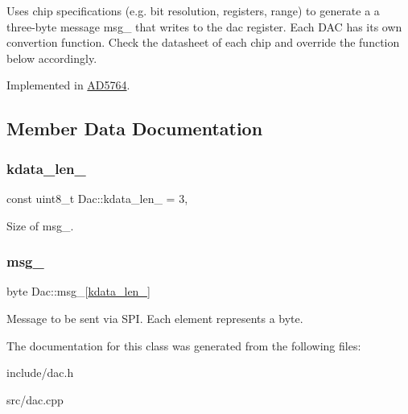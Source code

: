 Uses chip specifications (e.\+g. bit resolution, registers, range) to generate a a three-\/byte message msg\+\_\+ that writes to the dac register. Each D\+AC has its own convertion function. Check the datasheet of each chip and override the function below accordingly. 

Implemented in \mbox{\hyperlink{classAD5764_aae10d34276fdfcb3542e39bccd2f20f6}{A\+D5764}}.



\subsection{Member Data Documentation}
\mbox{\label{classDac_af3de0bf669183e66ebf916f8c685fe6b}} 
\subsubsection{\texorpdfstring{kdata\+\_\+len\+\_\+}{kdata\_len\_}}
{\footnotesize\ttfamily const uint8\+\_\+t Dac\+::kdata\+\_\+len\+\_\+ = 3\hspace{0.3cm}{\ttfamily [static]}, {\ttfamily [protected]}}

Size of msg\+\_\+. \mbox{\label{classDac_a82d9c857af6ba19123b3f5d5187dce1d}} 
\subsubsection{\texorpdfstring{msg\+\_\+}{msg\_}}
{\footnotesize\ttfamily byte Dac\+::msg\+\_\+\mbox{[}\mbox{\hyperlink{classDac_af3de0bf669183e66ebf916f8c685fe6b}{kdata\+\_\+len\+\_\+}}\mbox{]}\hspace{0.3cm}{\ttfamily [protected]}}

Message to be sent via S\+PI. Each element represents a byte. 

The documentation for this class was generated from the following files\+:\begin{DoxyCompactItemize}
\item 
include/dac.\+h\item 
src/dac.\+cpp\end{DoxyCompactItemize}
